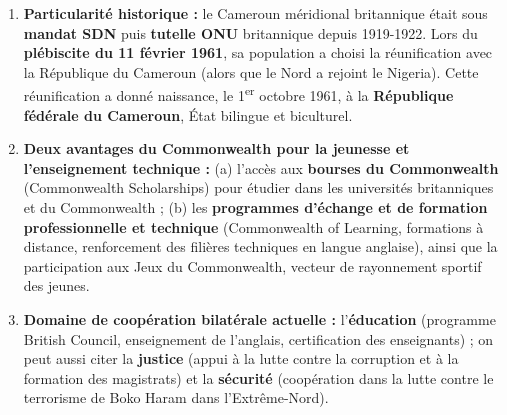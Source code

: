 \documentclass[11pt]{article}
\begin{document}
\begin{corrige}
\begin{enumerate}
\item \textbf{Particularité historique :} le Cameroun méridional britannique était sous \textbf{mandat SDN} puis \textbf{tutelle ONU} britannique depuis 1919-1922. Lors du \textbf{plébiscite du 11 février 1961}, sa population a choisi la réunification avec la République du Cameroun (alors que le Nord a rejoint le Nigeria). Cette réunification a donné naissance, le 1\textsuperscript{er} octobre 1961, à la \textbf{République fédérale du Cameroun}, État bilingue et biculturel.
\item \textbf{Deux avantages du Commonwealth pour la jeunesse et l'enseignement technique :} (a) l'accès aux \textbf{bourses du Commonwealth} (Commonwealth Scholarships) pour étudier dans les universités britanniques et du Commonwealth ; (b) les \textbf{programmes d'échange et de formation professionnelle et technique} (Commonwealth of Learning, formations à distance, renforcement des filières techniques en langue anglaise), ainsi que la participation aux Jeux du Commonwealth, vecteur de rayonnement sportif des jeunes.
\item \textbf{Domaine de coopération bilatérale actuelle :} l'\textbf{éducation} (programme British Council, enseignement de l'anglais, certification des enseignants) ; on peut aussi citer la \textbf{justice} (appui à la lutte contre la corruption et à la formation des magistrats) et la \textbf{sécurité} (coopération dans la lutte contre le terrorisme de Boko Haram dans l'Extrême-Nord).
\end{enumerate}
\end{corrige}
\end{document}
